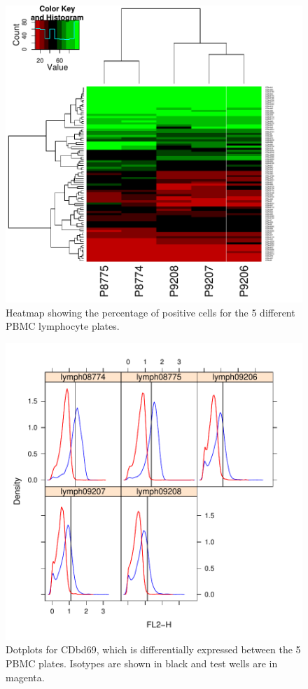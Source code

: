 \documentclass[12pt]{article}
\begin{document}
\begin{figure}
\begin{center}
\includegraphics{outline-pbmcHeat}
\end{center}
\caption{Heatmap showing the percentage of positive cells for the 5 different PBMC lymphocyte plates.}
\label{fig:pbmcHeat}
\end{figure}

\begin{figure}
\begin{center}
\includegraphics{outline-pbmcCDbd69}
\end{center}
\caption{Dotplots for CDbd69, which is differentially expressed between the 5 PBMC plates. Isotypes are shown in black and
test wells are in magenta.}
\label{fig:pbmcCDbd69}
\end{figure}
\end{document}
